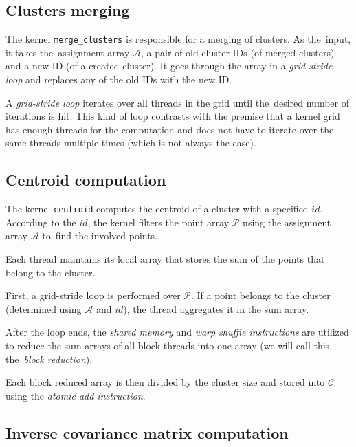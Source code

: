 \subsection{Clusters merging}


The kernel \texttt{merge\_clusters} is responsible for a merging of clusters. As the~input, it takes the~assignment array $\mathcal{A}$, a pair of old cluster IDs (of merged clusters) and a new ID (of a created cluster). It goes through the array in a \emph{grid-stride loop} and replaces any of the old IDs with the new ID.

\begin{defn}
	A \emph{grid-stride loop} iterates over all threads in the grid until the~desired number of iterations is hit. This kind of loop contrasts with the premise that a kernel grid has enough threads for the computation and does not have to iterate over the same threads multiple times (which is not always the case). 
	\label{def03:grid-stride}
\end{defn}

\subsection{Centroid computation}

The kernel \texttt{centroid} computes the centroid of a cluster with a specified $id$. According to the $id$, the kernel filters the point array $\mathcal{P}$ using the assignment array $\mathcal{A}$ to~find the involved points.

Each thread maintains its local array that stores the sum of the points that belong to the cluster. 

First, a grid-stride loop is performed over $\mathcal{P}$. If a point belongs to the cluster (determined using $\mathcal{A}$ and $id$), the thread aggregates it in the sum array. 

After the loop ends, the \emph{shared memory} and \emph{warp shuffle instructions} are utilized to reduce the sum arrays of all block threads into one array (we will call this the~\emph{block reduction}).

Each block reduced array is then divided by the cluster size and stored into $\mathcal{C}$ using the \emph{atomic add instruction}. 

\subsection{Inverse covariance matrix computation}


